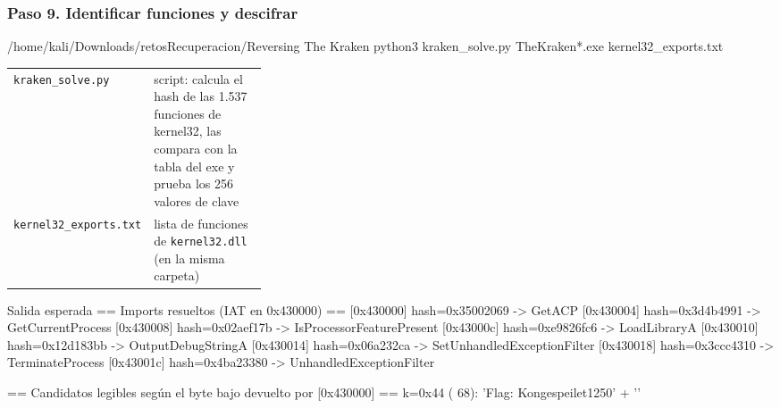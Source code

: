 \documentclass[11pt,a4paper]{article}
\begin{document}
\subsubsection*{Paso 9. Identificar funciones y descifrar}
\begin{comando}{/home/kali/Downloads/retosRecuperacion/Reversing The Kraken}
python3 kraken_solve.py TheKraken*.exe kernel32_exports.txt
\end{comando}
\begin{tcolorbox}[enhanced, breakable, colback=white, colframe=gray!40, boxrule=0.3pt, arc=1pt, left=4pt, right=4pt, top=2pt, bottom=2pt, fonttitle=\sffamily\scriptsize\bfseries, coltitle=black!75, colbacktitle=gray!8, title={Qué hace cada parte}, attach title to upper, before skip=2pt, after skip=4pt, fontupper=\small]
\par{\renewcommand{\arraystretch}{1.12}\begin{tabularx}{\linewidth}{@{}>{\raggedright\arraybackslash}p{0.33\linewidth}>{\raggedright\arraybackslash}X@{}}
\texttt{kraken\_\allowbreak{}solve.py} & script: calcula el hash de las 1.537 funciones de kernel32, las compara con la tabla del exe y prueba los 256 valores de clave \\
\texttt{kernel32\_\allowbreak{}exports.txt} & lista de funciones de \texttt{kernel32.dll} (en la misma carpeta) \\
\end{tabularx}}
\end{tcolorbox}
\begin{salidan}{Salida esperada}
== Imports resueltos (IAT en 0x430000) ==
  [0x430000]  hash=0x35002069  ->  GetACP
  [0x430004]  hash=0x3d4b4991  ->  GetCurrentProcess
  [0x430008]  hash=0x02aef17b  ->  IsProcessorFeaturePresent
  [0x43000c]  hash=0xe9826fc6  ->  LoadLibraryA
  [0x430010]  hash=0x12d183bb  ->  OutputDebugStringA
  [0x430014]  hash=0x06a232ca  ->  SetUnhandledExceptionFilter
  [0x430018]  hash=0x3ccc4310  ->  TerminateProcess
  [0x43001c]  hash=0x4ba23380  ->  UnhandledExceptionFilter

== Candidatos legibles según el byte bajo devuelto por [0x430000] ==
  k=0x44 ( 68): 'Flag: Kongespeilet1250' + ''
\end{salidan}
\end{document}
